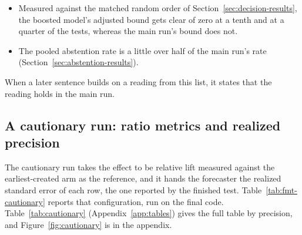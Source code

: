 \begin{itemize}
\item Measured against the matched random order of Section~\ref{sec:decision-results}, the boosted model's adjusted bound gets clear of zero at a tenth and at a quarter of the tests, whereas the main run's bound does not.
\item The pooled abstention rate is a little over half of the main run's rate (Section~\ref{sec:abstention-results}).
\end{itemize}
When a later sentence builds on a reading from this list, it states that the reading holds in the main run.

\begin{table}[t]\centering\scriptsize
\caption{The date rule on and off, headline archive: tests that started in the randomization window are excluded (the main run) or included. When the window is excluded, the origins of July and October 2013 score nothing, so seven origins are left. Planned precision fixes significance at the precision that the fixed exposure gives. The headline-only row sits at realized precision, and its interval is unadjusted. Calibration is rejected when the ECE percentile is above 95.}
\label{tab:fmt-window}
\resizebox{\columnwidth}{!}{%
}
\end{table}

\subsection{A cautionary run: ratio metrics and realized precision}
\label{sec:cautionary}
The cautionary run takes the effect to be relative lift measured against the earliest-created arm as the reference, and it hands the forecaster the realized standard error of each row, the one reported by the finished test. Table~\ref{tab:fmt-cautionary} reports that configuration, run on the final code. Table~\ref{tab:cautionary} (Appendix~\ref{app:tables}) gives the full table by precision, and Figure~\ref{fig:cautionary} is in the appendix.

